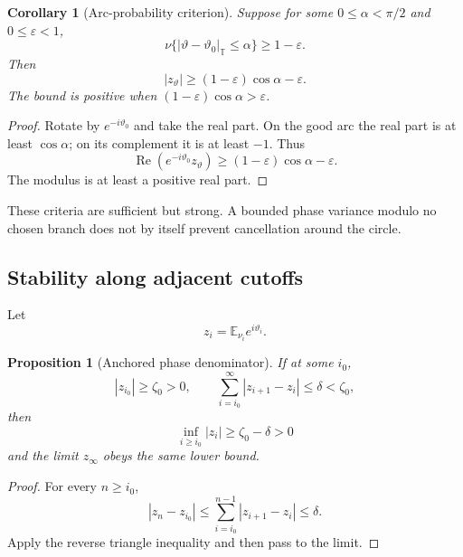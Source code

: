 \documentclass[11pt]{article}
\newtheorem{proposition}[theorem]{Proposition}
\newtheorem{corollary}[theorem]{Corollary}
\begin{document}
\begin{corollary}[Arc-probability criterion]
\label{cor:v11v69-arc}
Suppose for some \(0\le\alpha<\pi/2\) and \(0\le\varepsilon<1\),
\[
                \nu\{|\vartheta-\vartheta_0|_{\mathbb T}
                                  \le\alpha\}\ge1-\varepsilon. \tag{69.12}
\]
Then
\[
              |z_\vartheta|
       \ge (1-\varepsilon)\cos\alpha-\varepsilon.             \tag{69.13}
\]
The bound is positive when
\((1-\varepsilon)\cos\alpha>\varepsilon\).
\end{corollary}

\begin{proof}
Rotate by \(e^{-i\vartheta_0}\) and take the real part.  On the good arc
the real part is at least \(\cos\alpha\); on its complement it is at
least \(-1\).  Thus
\[
 \operatorname{Re}(e^{-i\vartheta_0}z_\vartheta)
 \ge(1-\varepsilon)\cos\alpha-\varepsilon.
\]
The modulus is at least a positive real part.
\end{proof}

These criteria are sufficient but strong.  A bounded phase variance
modulo no chosen branch does not by itself prevent cancellation around
the circle.

\subsection{Stability along adjacent cutoffs}

Let
\[
                         z_i={\mathbb E}_{\nu_i}e^{i\vartheta_i}.
                                                                  \tag{69.14}
\]

\begin{proposition}[Anchored phase denominator]
\label{prop:v11v69-anchor}
If at some \(i_0\),
\[
                         |z_{i_0}|\ge\zeta_0>0,\qquad
                         \sum_{i=i_0}^{\infty}|z_{i+1}-z_i|
                                  \le\delta<\zeta_0,           \tag{69.15}
\]
then
\[
                         \inf_{i\ge i_0}|z_i|
                              \ge\zeta_0-\delta>0              \tag{69.16}
\]
and the limit \(z_\infty\) obeys the same lower bound.
\end{proposition}

\begin{proof}
For every \(n\ge i_0\),
\[
 |z_n-z_{i_0}|
 \le\sum_{i=i_0}^{n-1}|z_{i+1}-z_i|
 \le\delta.
\]
Apply the reverse triangle inequality and then pass to the limit.
\end{proof}
\end{document}
